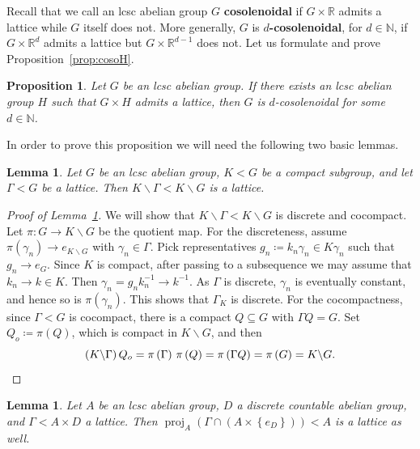 \documentclass{amsart}
\numberwithin{equation}{subsection}
\newtheorem{lem}[thm]{Lemma}
\newtheorem{prop}[thm]{Proposition}
\theoremstyle{remark}
\begin{document}
Recall that we call an lcsc abelian group \(G\) \textbf{cosolenoidal} if \(G\times\mathbb{R}\) admits a lattice while \(G\) itself does not. More generally, \(G\) is \textbf{$d$-cosolenoidal}, for \(d\in\mathbb{N}\), if \(G \times \mathbb{R}^{d}\) admits a lattice but \(G \times \mathbb{R}^{d-1}\) does not. Let us formulate and prove Proposition~\ref{prop:cosoH}.

\begin{prop}\label{prop:cosoH-App}
Let \(G\) be an lcsc abelian group. If there exists an lcsc abelian group \(H\) such that \(G\times H\) admits a lattice, then \(G\) is \(d\)-cosolenoidal for some \(d\in\mathbb{N}\).
\end{prop}

In order to prove this proposition we will need the following two basic lemmas.

\begin{lem}\label{lem:latquot}
Let \(G\) be an lcsc abelian group, \(K<G\) be a compact subgroup, and let \(\Gamma<G\) be a lattice. Then \(K\backslash\Gamma<K\backslash G\) is a lattice.
\end{lem}

\begin{proof}[Proof of Lemma~\ref{lem:latquot}]
We will show that \(K\backslash\Gamma<K\backslash G\) is discrete and cocompact. Let \(\pi:G\to K\backslash G\) be the quotient map. For the discreteness, assume \(\pi\left(\gamma_{n}\right)\to e_{K\backslash G}\) with \(\gamma_{n}\in\Gamma\).
Pick representatives \(g_{n}\coloneqq k_{n}\gamma_{n}\in K\gamma_{n}\) such that \(g_{n}\to e_{G}\). Since \(K\) is compact, after passing to a subsequence we may assume that \(k_{n}\to k\in K\). Then \(\gamma_{n}=g_{n}k_{n}^{-1}\to k^{-1}\). As \(\Gamma\) is discrete, \(\gamma_{n}\) is eventually constant, and hence so is \(\pi\left(\gamma_{n}\right)\). This shows that \(\Gamma_{K}\) is discrete. For the cocompactness, since \(\Gamma<G\) is cocompact, there is a compact \(Q\subseteq G\) with \(\Gamma Q=G\). Set \(Q_{o}\coloneqq \pi\left(Q\right)\), which is compact in \(K\backslash G\), and then
\[\left(K\backslash\Gamma\right)Q_{o}=\pi\left(\Gamma\right)\,\pi\left(Q\right)=\pi\left(\Gamma Q\right)=\pi\left(G\right)=K\backslash G.\qedhere\]
\end{proof}

\begin{lem}\label{lem:cosoH}
Let \(A\) be an lcsc abelian group, \(D\) a discrete countable abelian group, and \(\Gamma<A\times D\) a lattice. Then \(\operatorname{proj}_{A}\left(\Gamma\cap\left(A\times\left\{e_{D}\right\}\right)\right)<A\) is a lattice as well.
\end{lem}
\end{document}
